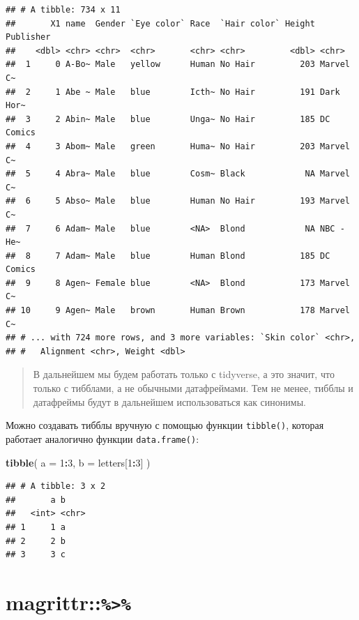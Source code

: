 \documentclass[
]{book}
\newenvironment{Shaded}{\begin{snugshade}}{\end{snugshade}}
\newcommand{\DataTypeTok}[1]{\textcolor[rgb]{0.13,0.29,0.53}{#1}}
\newcommand{\DecValTok}[1]{\textcolor[rgb]{0.00,0.00,0.81}{#1}}
\newcommand{\KeywordTok}[1]{\textcolor[rgb]{0.13,0.29,0.53}{\textbf{#1}}}
\newcommand{\NormalTok}[1]{#1}
\newcommand{\OperatorTok}[1]{\textcolor[rgb]{0.81,0.36,0.00}{\textbf{#1}}}
\begin{document}
\begin{verbatim}
## # A tibble: 734 x 11
##       X1 name  Gender `Eye color` Race  `Hair color` Height Publisher
##    <dbl> <chr> <chr>  <chr>       <chr> <chr>         <dbl> <chr>    
##  1     0 A-Bo~ Male   yellow      Human No Hair         203 Marvel C~
##  2     1 Abe ~ Male   blue        Icth~ No Hair         191 Dark Hor~
##  3     2 Abin~ Male   blue        Unga~ No Hair         185 DC Comics
##  4     3 Abom~ Male   green       Huma~ No Hair         203 Marvel C~
##  5     4 Abra~ Male   blue        Cosm~ Black            NA Marvel C~
##  6     5 Abso~ Male   blue        Human No Hair         193 Marvel C~
##  7     6 Adam~ Male   blue        <NA>  Blond            NA NBC - He~
##  8     7 Adam~ Male   blue        Human Blond           185 DC Comics
##  9     8 Agen~ Female blue        <NA>  Blond           173 Marvel C~
## 10     9 Agen~ Male   brown       Human Brown           178 Marvel C~
## # ... with 724 more rows, and 3 more variables: `Skin color` <chr>,
## #   Alignment <chr>, Weight <dbl>
\end{verbatim}

\begin{quote}
В дальнейшем мы будем работать только с tidyverse, а это значит, что только с тибблами, а не обычными датафреймами. Тем не менее, тибблы и датафреймы будут в дальнейшем использоваться как синонимы.
\end{quote}

Можно создавать тибблы вручную с помощью функции \texttt{tibble()}, которая работает аналогично функции \texttt{data.frame()}:

\begin{Shaded}
\begin{Highlighting}[]
\KeywordTok{tibble}\NormalTok{(}
  \DataTypeTok{a =} \DecValTok{1}\OperatorTok{:}\DecValTok{3}\NormalTok{,}
  \DataTypeTok{b =}\NormalTok{ letters[}\DecValTok{1}\OperatorTok{:}\DecValTok{3}\NormalTok{]}
\NormalTok{)}
\end{Highlighting}
\end{Shaded}

\begin{verbatim}
## # A tibble: 3 x 2
##       a b    
##   <int> <chr>
## 1     1 a    
## 2     2 b    
## 3     3 c
\end{verbatim}

\hypertarget{pipe}{%
\section{\texorpdfstring{magrittr::\texttt{\%\textgreater{}\%}}{magrittr::\%\textgreater\%}}\label{pipe}}
\end{document}
